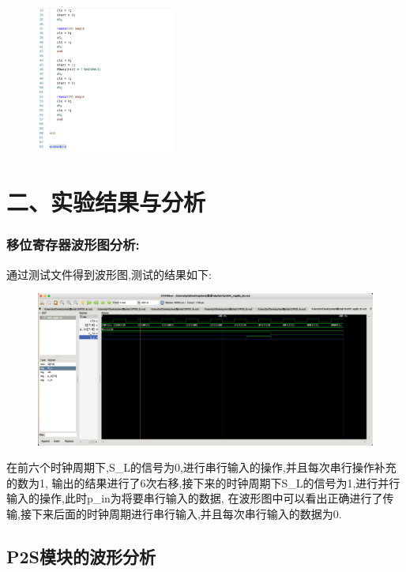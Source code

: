 \documentclass{article}
\begin{document}
 \begin{figure}[H]
        \centering
        \includegraphics[width=0.4\textwidth]{p6.png}
        
        \end{figure}


\section*{二、实验结果与分析}

\subsubsection*{移位寄存器波形图分析:}
通过测试文件得到波形图,测试的结果如下:
\begin{figure}[H]
    \centering
    \includegraphics[width=1\textwidth]{t1.png}
    
    \end{figure}
在前六个时钟周期下,S\_L的信号为0,进行串行输入的操作,并且每次串行操作补充的数为1,
输出的结果进行了6次右移,接下来的时钟周期下S\_L的信号为1,进行并行输入的操作,此时p\_in为将要串行输入的数据,
在波形图中可以看出正确进行了传输,接下来后面的时钟周期进行串行输入,并且每次串行输入的数据为0.


\subsection*{P2S模块的波形分析}
\end{document}
